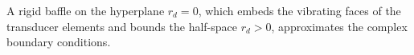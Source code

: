 A rigid baffle on
the hyperplane $r_{d} = 0$, which embeds
the vibrating faces of
the transducer elements and bounds
the half-space $r_{d} > 0$, approximates
the complex boundary conditions.
